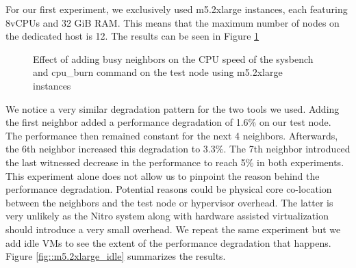 \noindent
For our first experiment, we exclusively used m5.2xlarge instances, each featuring 8vCPUs and 32 GiB RAM. 
This means that the maximum number of nodes on the dedicated host is 12. The results can 
be seen in Figure \ref{fig::m5.2xlarge_busy}

\begin{figure}[H]
\centering
{}
\caption{Effect of adding busy neighbors on the CPU speed of the sysbench and cpu\_burn command on the 
test node using m5.2xlarge instances}
\label{fig::m5.2xlarge_busy}
\end{figure}
\noindent
We notice a very similar degradation pattern for the two tools we used.
Adding the first neighbor added a performance degradation of  1.6\% on our test node. The performance then 
remained constant for the next 4 neighbors. Afterwards, the 6th neighbor increased this degradation to 
3.3\%. The 7th neighbor introduced the last witnessed decrease in the performance to reach 5\% in both 
experiments. \\ 
This experiment alone does not allow us to pinpoint the reason behind the performance degradation.
Potential reasons could be physical core co-location between the neighbors and the test node or 
hypervisor overhead. The latter is very unlikely as the Nitro system along with hardware assisted 
virtualization should introduce a very small overhead. 
We repeat the same experiment but we add idle VMs to see the extent of the performance degradation that 
happens. Figure \ref{fig::m5.2xlarge_idle} summarizes the results. 

